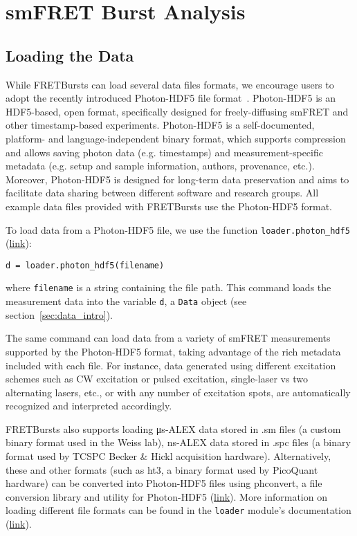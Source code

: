 \section{smFRET Burst Analysis}
\label{sec:analysis}

\subsection{Loading the Data}
\label{sec:dataload}
While FRETBursts can load several data files formats,
we encourage users to adopt the recently introduced Photon-HDF5 file format~\cite{Ingargiola2016}.
Photon-HDF5 is an HDF5-based, open format, specifically designed for freely-diffusing smFRET and 
other timestamp-based experiments.
Photon-HDF5 is a self-documented, platform- and language-independent binary format,
which supports compression and allows saving photon data (e.g. timestamps) and measurement-specific metadata
(e.g. setup and sample information, authors, provenance, etc.).
Moreover, Photon-HDF5 is designed for long-term data preservation and aims to facilitate data sharing
between different software and research groups.
All example data files provided with FRETBursts use the Photon-HDF5 format.

To load data from a Photon-HDF5 file, we use the function \verb|loader.photon_hdf5|
(\href{http://fretbursts.readthedocs.org/en/latest/loader.html#fretbursts.loader.photon_hdf5}{link}):

\begin{lstlisting}
d = loader.photon_hdf5(filename)
\end{lstlisting}

\noindent
where \verb|filename| is a string containing the file path.
This command loads the measurement data into the variable \verb|d|, 
a \verb|Data| object (see section~\ref{sec:data_intro}).

The same command can load data from a variety of smFRET measurements supported
by the Photon-HDF5 format, taking advantage of the rich metadata included with each file.
For instance, data generated using different excitation schemes such as CW excitation 
or pulsed excitation, single-laser vs two alternating lasers, etc., 
or with any number of excitation spots, are automatically recognized and interpreted accordingly.

FRETBursts also supports loading μs-ALEX data stored in .sm files
(a custom binary format used in the Weiss lab),
ns-ALEX data stored in .spc files (a binary format used by TCSPC Becker \& Hickl acquisition hardware).
Alternatively, these and other formats (such as ht3, a binary format used by PicoQuant hardware) 
can be converted into Photon-HDF5 files using phconvert, 
a file conversion library and utility for Photon-HDF5 
(\href{http://photon-hdf5.github.io/phconvert/}{link}).
More information on loading different file formats 
can be found in the \verb|loader| module's documentation
(\href{http://fretbursts.readthedocs.org/en/latest/loader.html}{link}).

